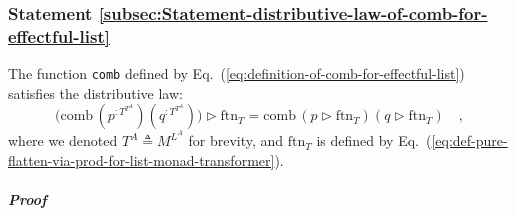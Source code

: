 \subsubsection{Statement \label{subsec:Statement-distributive-law-of-comb-for-effectful-list}\ref{subsec:Statement-distributive-law-of-comb-for-effectful-list}}

The function \lstinline!comb! defined by Eq.~(\ref{eq:definition-of-comb-for-effectful-list})
satisfies the distributive law:
\[
\big(\text{comb}\,(p^{:T^{T^{A}}})(q^{:T^{T^{A}}})\big)\triangleright\text{ftn}_{T}=\text{comb}\,(p\triangleright\text{ftn}_{T})(q\triangleright\text{ftn}_{T})\quad,
\]
where we denoted $T^{A}\triangleq M^{L^{A}}$ for brevity, and $\text{ftn}_{T}$
is defined by Eq.~(\ref{eq:def-pure-flatten-via-prod-for-list-monad-transformer}).

\subparagraph{Proof}

